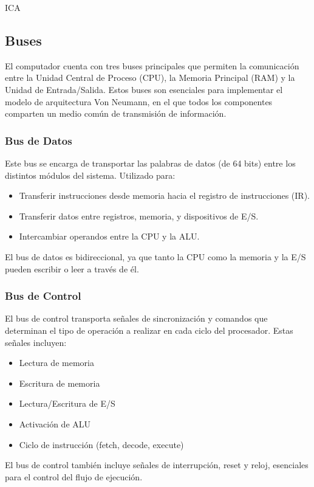 ICA\documentclass{article}
\begin{document}
\subsection{Buses}

El computador cuenta con tres buses principales que permiten la comunicación entre
la Unidad Central de Proceso (CPU), la Memoria Principal (RAM) y la Unidad de
Entrada/Salida. Estos buses son esenciales para implementar el
modelo de arquitectura Von Neumann, en el que todos los componentes
comparten un medio común de transmisión de información.

\subsubsection*{Bus de Datos}

Este bus se encarga de transportar las palabras de datos
(de 64 bits) entre los distintos módulos del sistema. Utilizado para:
\begin{itemize}
  \item Transferir instrucciones desde memoria hacia el registro de instrucciones (IR).
  \item Transferir datos entre registros, memoria, y dispositivos de E/S.
  \item Intercambiar operandos entre la CPU y la ALU.
\end{itemize}
El bus de datos es bidireccional, ya que tanto la CPU como la memoria y la E/S
pueden escribir o leer a través de él.

\subsubsection*{Bus de Control}

El bus de control transporta señales de sincronización y
comandos que determinan el tipo de operación a realizar en cada
ciclo del procesador. Estas señales incluyen:
\begin{itemize}
  \item Lectura de memoria
  \item Escritura de memoria
  \item Lectura/Escritura de E/S
  \item Activación de ALU
  \item Ciclo de instrucción (fetch, decode, execute)
\end{itemize}
El bus de control también incluye señales de interrupción, reset y
reloj, esenciales para el control del flujo de ejecución.
\end{document}
